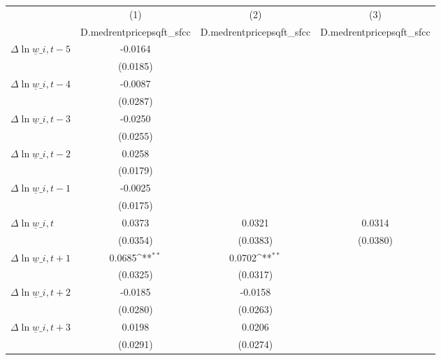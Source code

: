 {
\def\sym#1{\ifmmode^{#1}\else\(^{#1}\)\fi}
\begin{tabular}{l*{3}{c}}
\hline\hline
          &\multicolumn{1}{c}{(1)}&\multicolumn{1}{c}{(2)}&\multicolumn{1}{c}{(3)}\\
          &\multicolumn{1}{c}{D.medrentpricepsqft\_sfcc}&\multicolumn{1}{c}{D.medrentpricepsqft\_sfcc}&\multicolumn{1}{c}{D.medrentpricepsqft\_sfcc}\\
\hline
$\Delta \ln \underline{w}\_{i,t-5}$&  -0.0164         &                  &                  \\
          & (0.0185)         &                  &                  \\
[1em]
$\Delta \ln \underline{w}\_{i,t-4}$&  -0.0087         &                  &                  \\
          & (0.0287)         &                  &                  \\
[1em]
$\Delta \ln \underline{w}\_{i,t-3}$&  -0.0250         &                  &                  \\
          & (0.0255)         &                  &                  \\
[1em]
$\Delta \ln \underline{w}\_{i,t-2}$&   0.0258         &                  &                  \\
          & (0.0179)         &                  &                  \\
[1em]
$\Delta \ln \underline{w}\_{i,t-1}$&  -0.0025         &                  &                  \\
          & (0.0175)         &                  &                  \\
[1em]
$\Delta \ln \underline{w}\_{i,t}$&   0.0373         &   0.0321         &   0.0314         \\
          & (0.0354)         & (0.0383)         & (0.0380)         \\
[1em]
$\Delta \ln \underline{w}\_{i,t+1}$&   0.0685\sym{**} &   0.0702\sym{**} &                  \\
          & (0.0325)         & (0.0317)         &                  \\
[1em]
$\Delta \ln \underline{w}\_{i,t+2}$&  -0.0185         &  -0.0158         &                  \\
          & (0.0280)         & (0.0263)         &                  \\
[1em]
$\Delta \ln \underline{w}\_{i,t+3}$&   0.0198         &   0.0206         &                  \\
          & (0.0291)         & (0.0274)         &                  \\

\end{tabular}}
